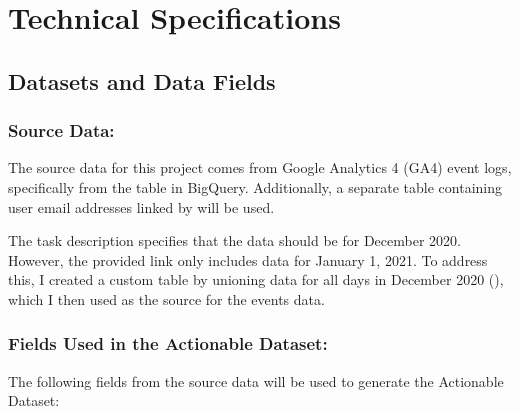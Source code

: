 \documentclass[a4paper,11pt,leqno,openbib,oldfontcommands,oneside]{memoir}
\begin{document}
\section{Technical Specifications}
\label{sec:Part2}

\subsection{Datasets and Data Fields}

\subsubsection{Source Data:}
The source data for this project comes from Google Analytics 4 (GA4) event logs, specifically from the  table in BigQuery. Additionally, a separate table containing user email addresses linked by  will be used.

\vspace{3pt}
\begin{center}
\begin{tcolorbox}[sidenote]
The task description specifies that the data should be for December 2020. However, the provided link only includes data for January 1, 2021. To address this, I created a custom table by unioning data for all days in December 2020 (), which I then used as the source for the events data.
\end{tcolorbox}
\end{center}
\vspace{3pt}

\subsubsection{Fields Used in the Actionable Dataset:}
The following fields from the source data will be used to generate the Actionable Dataset:
\end{document}
